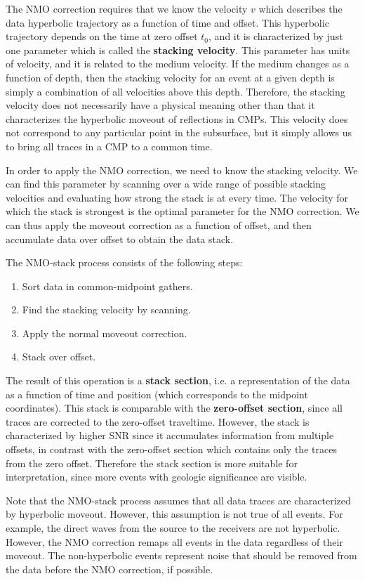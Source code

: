 The NMO correction requires that we know the velocity $v$ which
describes the data hyperbolic trajectory as a function of time and
offset. This hyperbolic trajectory depends on the time at zero offset
$t_0$, and it is characterized by just one parameter which is called
the \textbf{stacking velocity}. This parameter has units of velocity,
and it is related to the medium velocity. If the medium changes as a
function of depth, then the stacking velocity for an event at a given
depth is simply a combination of all velocities above this
depth. Therefore, the stacking velocity does not necessarily have a
physical meaning other than that it characterizes the hyperbolic
moveout of reflections in CMPs. This velocity does not correspond to
any particular point in the subsurface, but it simply allows us to
bring all traces in a CMP to a common time.

In order to apply the NMO correction, we need to know the stacking
velocity. We can find this parameter by scanning over a wide range of
possible stacking velocities and evaluating how strong the stack is at
every time. The velocity for which the stack is strongest is the
optimal parameter for the NMO correction. We can thus apply the
moveout correction as a function of offset, and then accumulate data
over offset to obtain the data stack.

The NMO-stack process consists of the following steps:
\begin{enumerate}
\item Sort data in common-midpoint gathers.
\item Find the stacking velocity by scanning.
\item Apply the normal moveout correction.
\item Stack over offset.
\end{enumerate}
The result of this operation is a \textbf{stack section}, i.e. a
representation of the data as a function of time and position (which
corresponds to the midpoint coordinates). This stack is comparable
with the \textbf{zero-offset section}, since all traces are corrected
to the zero-offset traveltime. However, the stack is characterized by
higher SNR since it accumulates information from multiple offsets, in
contrast with the zero-offset section which contains only the traces
from the zero offset. Therefore the stack section is more suitable for
interpretation, since more events with geologic significance are
visible.

Note that the NMO-stack process assumes that all data traces are
characterized by hyperbolic moveout. However, this assumption is not
true of all events. For example, the direct waves from the source to
the receivers are not hyperbolic. However, the NMO correction remaps
all events in the data regardless of their moveout. The non-hyperbolic
events represent noise that should be removed from the data before the
NMO correction, if possible.
